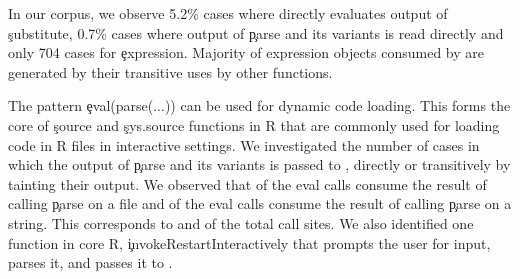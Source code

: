 \documentclass[conference]{IEEEtran}
\begin{document}
In our corpus, we observe 5.2\% cases where \eval directly evaluates output of
\c{substitute}, 0.7\% cases where output of \c{parse} and its variants is read
directly and only 704 cases for \c{expression}. Majority of expression objects
consumed by \eval are generated by their transitive uses by other functions.

The pattern \c{eval(parse(...))} can be used for dynamic code loading. This
forms the core of \c{source} and \c{sys.source} functions in R that are commonly
used for loading code in R files in interactive settings. We investigated the
number of cases in which the output of \c{parse} and its variants is passed to
\eval, directly or transitively by tainting their output. We observed that
\PercentParsedEvals of the eval calls consume the result of calling \c{parse} on
a file and \PasteParsedEvals of the eval calls consume the result of calling
\c{parse} on a string. This corresponds to \PercentParsedCallSites and
\PasteParsedCallSite of the total \eval call sites. We also identified one
function in core R, \c{invokeRestartInteractively} that prompts the user for
input, parses it, and passes it to \eval.

\end{document}
